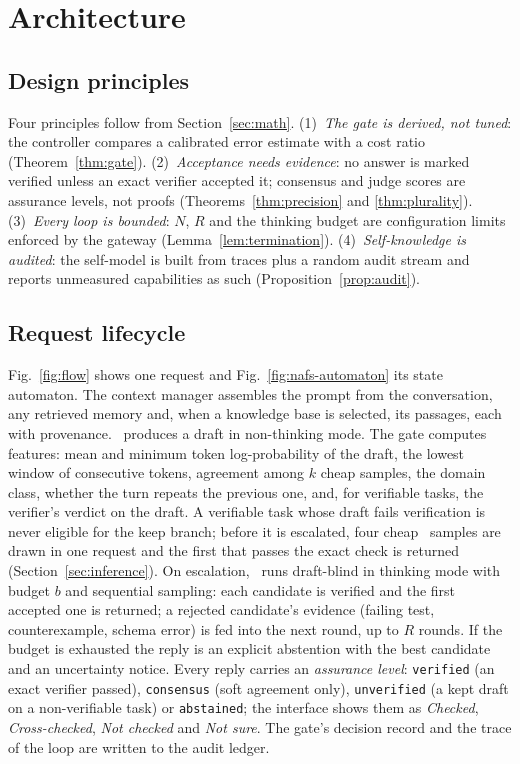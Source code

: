 \section{Architecture}
\label{sec:arch}

\subsection{Design principles}
Four principles follow from Section~\ref{sec:math}. (1)~\emph{The gate is
derived, not tuned}: the controller compares a calibrated error estimate with
a cost ratio (Theorem~\ref{thm:gate}). (2)~\emph{Acceptance needs evidence}:
no answer is marked verified unless an exact verifier accepted it; consensus
and judge scores are assurance levels, not proofs
(Theorems~\ref{thm:precision} and \ref{thm:plurality}). (3)~\emph{Every loop is
bounded}: $N$, $R$ and the thinking budget are configuration limits enforced
by the gateway (Lemma~\ref{lem:termination}). (4)~\emph{Self-knowledge is
audited}: the self-model is built from traces plus a random audit stream and
reports unmeasured capabilities as such (Proposition~\ref{prop:audit}).

\subsection{Request lifecycle}
Fig.~\ref{fig:flow} shows one request and Fig.~\ref{fig:nafs-automaton} its
state automaton. The context manager assembles the prompt from the
conversation, any retrieved memory and, when a knowledge base is selected, its
passages, each with provenance. \Sone\ produces a draft in non-thinking mode.
The gate computes features: mean and minimum token log-probability of the
draft, the lowest window of consecutive tokens, agreement among $k$ cheap
samples, the domain class, whether the turn repeats the previous one, and, for
verifiable tasks, the verifier's verdict on the draft. A verifiable task whose
draft fails verification is never eligible for the keep branch; before it is
escalated, four cheap \Sone\ samples are drawn in one request and the first
that passes the exact check is returned (Section~\ref{sec:inference}). On
escalation, \Stwo\ runs draft-blind in thinking mode with budget $b$ and
sequential sampling: each candidate is verified and the first accepted one is
returned; a rejected candidate's evidence (failing test, counterexample, schema
error) is fed into the next round, up to $R$ rounds. If the budget is
exhausted the reply is an explicit abstention with the best candidate and an
uncertainty notice. Every reply carries an \emph{assurance level}:
\texttt{verified} (an exact verifier passed), \texttt{consensus} (soft
agreement only), \texttt{unverified} (a kept draft on a non-verifiable task) or
\texttt{abstained}; the interface shows them as \emph{Checked},
\emph{Cross-checked}, \emph{Not checked} and \emph{Not sure}. The gate's
decision record and the trace of the loop are written to the audit ledger.


